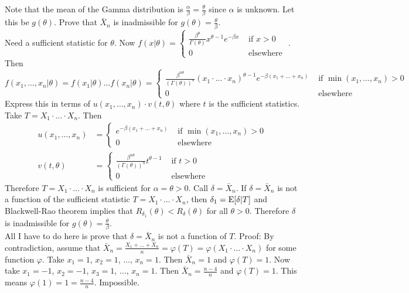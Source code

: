 \documentclass[12pt]{article}
\begin{document}
Note that the mean of the Gamma distribution is $\frac{\alpha}{\beta} = \frac{\theta}{\beta}$ since $\alpha$ is unknown. Let this be $g(\theta)$. Prove that $\bar{X}_n$ is inadmissible for $g(\theta) = \frac{\theta}{\beta}$. \\
Need a sufficient statistic for $\theta$. Now $f(x|\theta) = \begin{cases} \frac{\beta^\theta}{\Gamma(\theta)} x^{\theta -1} e^{-\beta x} &\text{ if } x > 0 \\ 0 &\text{ elsewhere }\end{cases}$. Then $$f(x_1,\dots,x_n|\theta) = f(x_1|\theta)\dots f(x_n|\theta) = \begin{cases} \frac{\beta^{n\theta}}{(\Gamma(\theta))^n} (x_1 \cdot \dots \cdot x_n)^{\theta -1} e^{-\beta(x_1 + \dots + x_n)} &\text{ if } \min(x_1,\dots,x_n) > 0 \\ 0 &\text{ elsewhere} \end{cases} $$ 
Express this in terms of $u(x_1,\dots,x_n) \cdot v(t, \theta)$ where $t$ is the sufficient statistics. \\
Take $T = X_1\cdot \dots \cdot X_n$. Then $$ \begin{aligned} u(x_1,\dots,x_n) &= \begin{cases} e^{-\beta(x_1 + \dots + x_n)} &\text{ if } \min(x_1,\dots,x_n) > 0 \\ 0 &\text{ elsewhere} \end{cases} \\ v(t, \theta) &= \begin{cases} \frac{\beta^{n\theta}}{(\Gamma(\theta))^n} t^{\theta - 1} &\text{ if } t > 0 \\ 0 &\text{ elsewhere } \end{cases} \end{aligned} $$ 
Therefore $T = X_1 \cdot \dots \cdot X_n$ is sufficient for $\alpha = \theta > 0$. Call $\delta = \bar{X}_n$. If $\delta = \bar{X}_n$ is not a function of the sufficient statistic $T = X_1 \cdot \dots \cdot X_n$, then $\delta_1 = \mathrm{E}[ \delta | T ]$ and Blackwell-Rao theorem implies that $R_{\delta_1}(\theta) < R_{\delta}(\theta)$ for all $\theta > 0$. Therefore $\delta$ is inadmissible for $g(\theta) = \frac{\theta}{\beta}$. \\
All I have to do here is prove that $\delta = \bar{X}_n$ is not a function of $T$. Proof: By contradiction, assume that $\bar{X}_n = \frac{X_1 + \dots + X_n}{n} = \varphi(T) = \varphi(X_1 \cdot \dots \cdot X_n)$ for some function $\varphi$. Take $x_1 = 1$, $x_2 = 1$, $\dots$, $x_n = 1$. Then $\bar{X}_n = 1$ and $\varphi(T) = 1$. Now take $x_1 = -1$, $x_2 = -1$, $x_3 = 1$, $\dots$, $x_n = 1$. Then $\bar{X}_n = \frac{n-4}{n}$ and $\varphi(T) = 1$. This means $\varphi(1) = 1 = \frac{n-4}{n}$. Impossible. \\~\\
\end{document}

